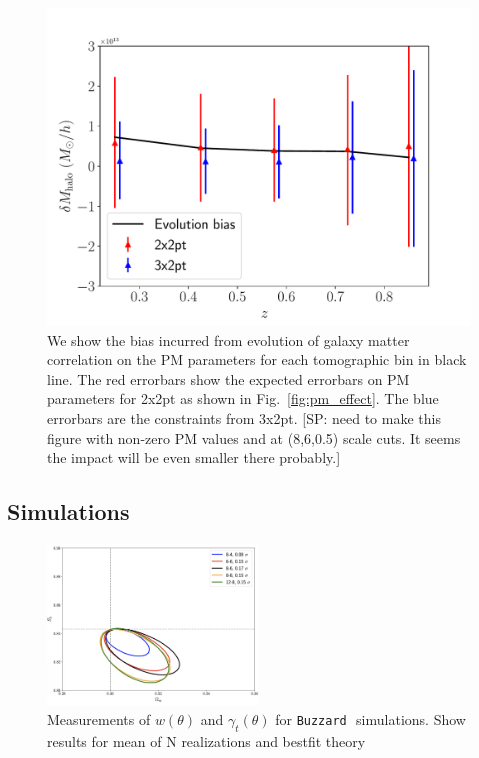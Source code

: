 \documentclass[fleqn,usenatbib]{mnras}
\newcommand{\gammat}{\ensuremath{\gamma_{t}(\theta)} }
\newcommand{\wtheta}{\ensuremath{w(\theta)} }
\newcommand{\buzzard}{\texttt{Buzzard}\,}
\newcommand{\SP}[1]{{\color{brown}[SP: #1]}}
\begin{document}
\begin{figure}
\includegraphics[width=\columnwidth]{figs/PM_evolve_impact.pdf}
\caption[]{We show the bias incurred from evolution of galaxy matter correlation on the PM parameters for each tomographic bin in black line. The red errorbars show the expected errorbars on PM parameters for 2x2pt as shown in Fig.~\ref{fig:pm_effect}. The blue errorbars are the constraints from 3x2pt. \SP{need to make this figure with non-zero PM values and at (8,6,0.5) scale cuts. It seems the impact will be even smaller there probably.}
}
\label{fig:pm_evolve}
\end{figure}




\subsection{Simulations}

\begin{figure}
\includegraphics[width=0.5\textwidth,draft]{figs/temp.png}
\caption[]{Measurements of \wtheta and \gammat for \buzzard \ simulations. Show results for mean of N realizations and bestfit theory }
\label{fig:buzzard_2pt}
\end{figure}
\end{document}
